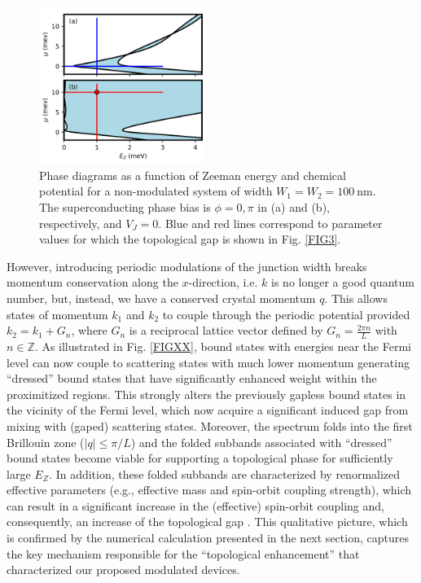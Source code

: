 \documentclass[twocolumn,aps,prb,nofootinbib]{revtex4-2}
\begin{document}
\begin{figure}[t]
\begin{center}
\includegraphics[width=0.48\textwidth]{Fig2.png}
\end{center}
\vspace{-0.6cm}
\caption{Phase diagrams as a function of Zeeman energy and chemical potential for a non-modulated system of width $W_1 = W_2 = 100~\text{nm}$. The superconducting phase bias is $\phi = 0, \pi$ in (a) and (b), respectively, and $V_J = 0$. Blue and red lines correspond to parameter values for which the topological gap is shown in Fig. \ref{FIG3}.}
\label{FIG2}
\vspace{-1mm}
\end{figure}

However, introducing periodic modulations of the junction width breaks momentum conservation along the $x$-direction, i.e. $k$ is no longer a good quantum number, but, instead, we have a conserved crystal momentum $q$. This allows states of momentum $k_1$ and $k_2$ to couple through the periodic potential provided $k_2 = k_1 + G_n$, where $G_n$ is a reciprocal lattice vector defined by $G_n = \frac{2 \pi n}{L}$ with $n \in \mathbb{Z}$. As illustrated in Fig. \ref{FIGXX}, bound states with energies near the Fermi level can now couple to scattering states with much lower 
momentum generating ``dressed'' bound states that have significantly enhanced weight within the proximitized regions. This strongly alters the previously gapless bound states in the vicinity of the Fermi level, which now acquire a significant induced gap from mixing with (gaped) scattering states. Moreover, the spectrum folds into the first Brillouin zone ($|q| \leq \pi/L$) and the folded subbands associated with ``dressed'' bound states become viable for supporting a topological phase for sufficiently large $E_Z$. In addition, these folded subbands are characterized by renormalized effective parameters (e.g., effective mass and spin-orbit coupling strength), which can result in a significant increase in the (effective) spin-orbit coupling and, consequently, an increase of the topological gap \cite{Woods2020b}. This qualitative picture, which is confirmed by the numerical calculation presented in the next section, captures the key mechanism responsible for the ``topological enhancement'' that characterized our proposed modulated devices.
\end{document}
